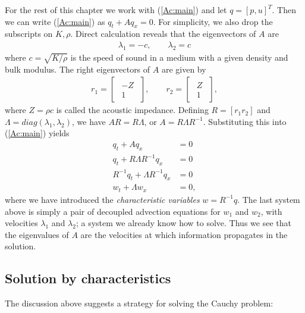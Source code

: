 \documentclass[11pt]{article}
\begin{document}
    For the rest of this chapter we work with (\ref{Ac:main}) and let
\(q=[p,u]^T\). Then we can write (\ref{Ac:main}) as \(q_t + A q_x = 0\).
For simplicity, we also drop the subscripts on \(K, \rho\). Direct
calculation reveals that the eigenvectors of \(A\) are \begin{align}
\lambda_1 = -c, \qquad \lambda_2 = c
\end{align} where \(c=\sqrt{{K}/{\rho}}\) is the speed of sound in a
medium with a given density and bulk modulus. The right eigenvectors of
\(A\) are given by \begin{align*}
r_1 = \begin{bmatrix}\begin{array}{c}-Z\\1\end{array}\end{bmatrix}, \qquad r_2 = \begin{bmatrix}\begin{array}{c}Z\\1\end{array}\end{bmatrix},
\end{align*} where \(Z=\rho c\) is called the acoustic impedance.
Defining \(R = [r_1 r_2]\) and \(\Lambda = diag(\lambda_1, \lambda_2)\),
we have \(AR = R\Lambda\), or \(A = R \Lambda R^{-1}\). Substituting
this into (\ref{Ac:main}) yields \begin{align*}
q_t + A q_x & = 0 \\
q_t + R \Lambda R^{-1} q_x & = 0 \\
R^{-1}q_t + \Lambda R^{-1} q_x & = 0 \\
w_t + \Lambda w_x & = 0,
\end{align*} where we have introduced the \emph{characteristic
variables} \(w=R^{-1}q\). The last system above is simply a pair of
decoupled advection equations for \(w_1\) and \(w_2\), with velocities
\(\lambda_1\) and \(\lambda_2\); a system we already know how to solve.
Thus we see that the eigenvalues of \(A\) are the velocities at which
information propagates in the solution.

    \hypertarget{solution-by-characteristics}{%
\subsection{Solution by
characteristics}\label{solution-by-characteristics}}

    The discussion above suggests a strategy for solving the Cauchy problem:
\end{document}
